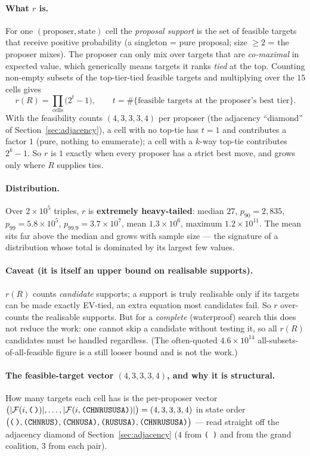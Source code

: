 \documentclass[11pt]{article}
\newcommand{\state}[1]{\texttt{(#1)}}
\newcommand{\empt}{\texttt{(\,)}}
\begin{document}
\paragraph{What $r$ is.} For one $(\text{proposer},\text{state})$ cell the
\emph{proposal support} is the set of feasible targets that receive positive
probability (a singleton = pure proposal; size $\geq2$ = the proposer mixes). The
proposer can only mix over targets that are \emph{co-maximal} in expected value, which
generically means targets it ranks \emph{tied} at the top. Counting non-empty subsets
of the top-tier-tied feasible targets and multiplying over the $15$ cells gives
\[
r(R)=\prod_{\text{cells}}\big(2^{t}-1\big),\qquad t=\#\{\text{feasible targets at the proposer's best tier}\}.
\]
With the feasibility counts $(4,3,3,3,4)$ per proposer (the adjacency ``diamond'' of
Section~\ref{sec:adjacency}), a cell with no top-tie has $t{=}1$ and contributes a
factor $1$ (pure, nothing to enumerate); a cell with a $k$-way top-tie contributes
$2^k-1$. So $r$ is $1$ exactly when every proposer has a strict best move, and grows
only where $R$ supplies ties.

\paragraph{Distribution.} Over $2\times10^5$ triples, $r$ is \textbf{extremely
heavy-tailed}: median $27$, $p_{90}=2{,}835$, $p_{99}=5.8\times10^5$,
$p_{99.9}=3.7\times10^7$, mean $1.3\times10^6$, maximum $1.2\times10^{11}$. The mean
sits far above the median and grows with sample size --- the signature of a
distribution whose total is dominated by its largest few values.

\paragraph{Caveat (it is itself an upper bound on realisable supports).} $r(R)$ counts
\emph{candidate} supports; a support is truly realisable only if its targets can be
made exactly EV-tied, an extra equation most candidates fail. So $r$ over-counts the
realisable supports. But for a \emph{complete} (waterproof) search this does not
reduce the work: one cannot skip a candidate without testing it, so all $r(R)$
candidates must be handled regardless. (The often-quoted $4.6\times10^{14}$
all-subsets-of-all-feasible figure is a still looser bound and is not the work.)


\paragraph{The feasible-target vector $(4,3,3,3,4)$, and why it is structural.} How
many targets each cell has is the per-proposer vector
$\big(|\mathcal F(i,\empt)|,\dots,|\mathcal F(i,\state{CHNRUSUSA})|\big)=(4,3,3,3,4)$
in state order $\big(\empt,\state{CHNRUS},\state{CHNUSA},\state{RUSUSA},
\state{CHNRUSUSA}\big)$ --- read straight off the adjacency diamond of
Section~\ref{sec:adjacency} ($4$ from \empt{} and from the grand coalition, $3$ from
each pair).
\end{document}
